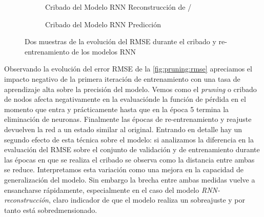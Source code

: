 \begin{figure}[!ht]
  \centering
  \begin{subfigure}[b]{0.48\textwidth}
      \centering
      \caption{\footnotesize \label{fig:pruning:recon}Cribado del Modelo RNN Reconstrucción de \ifell/}
  \end{subfigure}
  \hfill
  \begin{subfigure}[b]{0.48\textwidth}
      \centering
      \caption{\footnotesize \label{fig:pruning:predict}Cribado del Modelo RNN Predicción}
  \end{subfigure}
  \caption{\label{fig:pruning:rmse}Dos muestras de la evolución del RMSE durante el cribado y re-entrenamiento de los modelos RNN}
\end{figure}

Observando la evolución del error RMSE de la \autoref{fig:pruning:rmse} apreciamos el impacto negativo de la primera iteración de entrenamiento con una tasa de aprendizaje alta sobre la precisión del modelo. Vemos como el \textit{pruning} o cribado de nodos afecta negativamente en la evaluaciónde la función de pérdida en el momento que entra y prácticamente hasta que en la época 5 termina la eliminación de neuronas. Finalmente las épocas de re-entrenamiento y reajuste devuelven la red a un estado similar al original. Entrando en detalle hay un segundo efecto de esta técnica sobre el modelo: si analizamos la diferencia en la evaluación del RMSE sobre el conjunto de validación y de entrenamiento durante las épocas en que se realiza el cribado se observa como la distancia entre ambas se reduce. Interpretamos esta variación como una mejora en la capacidad de generalización del modelo. Sin embargo la brecha entre ambas medidas vuelve a ensancharse rápidamente, especialmente en el caso del modelo \textit{RNN-reconstrucción}, claro indicador de que el modelo realiza un sobreajuste y por tanto está sobredmensionado.



